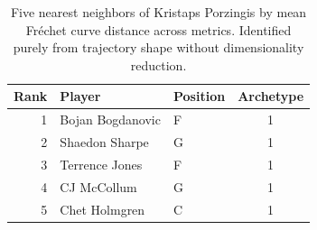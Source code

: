 \begin{table}[htbp]
  \centering\small
  \begin{tabular}{rllc}
    \toprule
    Rank & Player & Position & Archetype \\
    \midrule
    1 & Bojan Bogdanovic & F & 1 \\
    2 & Shaedon Sharpe & G & 1 \\
    3 & Terrence Jones & F & 1 \\
    4 & CJ McCollum & G & 1 \\
    5 & Chet Holmgren & C & 1 \\
    \bottomrule
  \end{tabular}
  \caption{Five nearest neighbors of Kristaps Porzingis by mean Fr\'{e}chet curve distance across metrics. Identified purely from trajectory shape without dimensionality reduction.}
  \label{tab:Kristaps_Porzingis_frechet_curve_neighbors}
\end{table}

